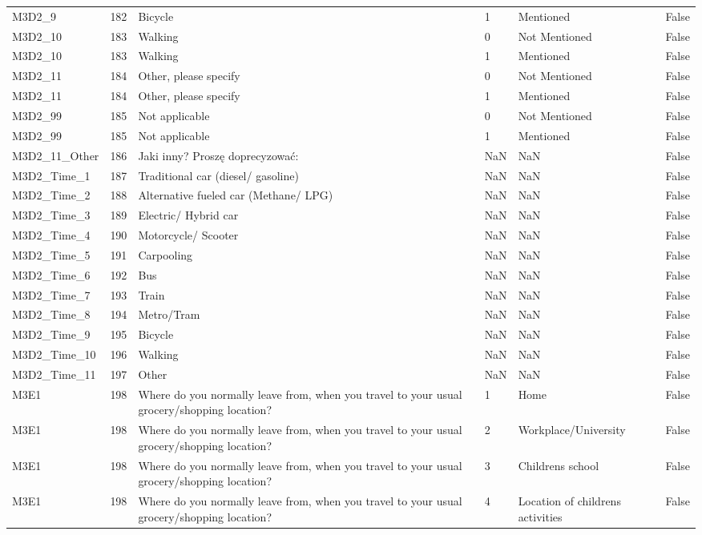 \begin{tabular}{lrlllr}
M3D2_9 & 182 & Bicycle & 1 & Mentioned & False \\
M3D2_10 & 183 & Walking & 0 & Not Mentioned & False \\
M3D2_10 & 183 & Walking & 1 & Mentioned & False \\
M3D2_11 & 184 & Other, please specify & 0 & Not Mentioned & False \\
M3D2_11 & 184 & Other, please specify & 1 & Mentioned & False \\
M3D2_99 & 185 & Not applicable & 0 & Not Mentioned & False \\
M3D2_99 & 185 & Not applicable & 1 & Mentioned & False \\
M3D2_11_Other & 186 & Jaki inny? Proszę doprecyzować: & NaN & NaN & False \\
M3D2_Time_1 & 187 & Traditional car (diesel/ gasoline) & NaN & NaN & False \\
M3D2_Time_2 & 188 & Alternative fueled car (Methane/ LPG) & NaN & NaN & False \\
M3D2_Time_3 & 189 & Electric/ Hybrid car & NaN & NaN & False \\
M3D2_Time_4 & 190 & Motorcycle/ Scooter & NaN & NaN & False \\
M3D2_Time_5 & 191 & Carpooling & NaN & NaN & False \\
M3D2_Time_6 & 192 & Bus & NaN & NaN & False \\
M3D2_Time_7 & 193 & Train & NaN & NaN & False \\
M3D2_Time_8 & 194 & Metro/Tram & NaN & NaN & False \\
M3D2_Time_9 & 195 & Bicycle & NaN & NaN & False \\
M3D2_Time_10 & 196 & Walking & NaN & NaN & False \\
M3D2_Time_11 & 197 & Other & NaN & NaN & False \\
M3E1 & 198 & Where do you normally leave from, when you travel to your usual grocery/shopping location? & 1 & Home & False \\
M3E1 & 198 & Where do you normally leave from, when you travel to your usual grocery/shopping location? & 2 & Workplace/University & False \\
M3E1 & 198 & Where do you normally leave from, when you travel to your usual grocery/shopping location? & 3 & Childrens school & False \\
M3E1 & 198 & Where do you normally leave from, when you travel to your usual grocery/shopping location? & 4 & Location of childrens activities & False \\

\end{tabular}

